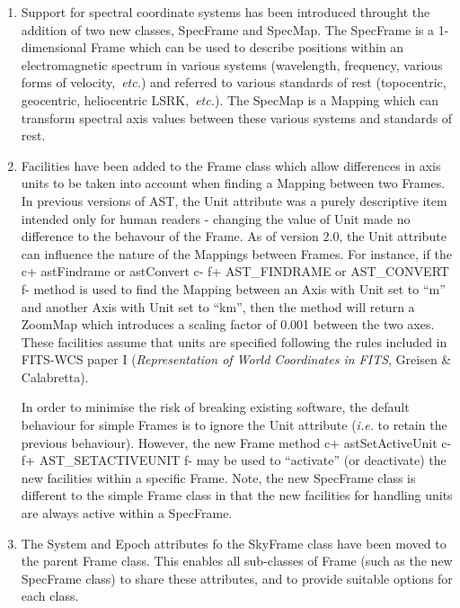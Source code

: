 \documentclass[twoside,11pt]{article}
\begin{document}
\begin{enumerate}

\item Support for spectral coordinate systems has been introduced
throught the addition of two new classes, SpecFrame and SpecMap.
The SpecFrame is a 1-dimensional Frame which can be used to describe
positions within an electromagnetic spectrum in various systems
(wavelength, frequency, various forms of velocity,~{\em{etc.}}) and referred
to various standards of rest (topocentric, geocentric, heliocentric
LSRK,~{\em{etc.}}). The SpecMap is a Mapping which can transform spectral
axis values between these various systems and standards of rest.

\item Facilities have been added to the Frame class which allow
differences in axis units to be taken into account when finding a Mapping
between two Frames. In previous versions of AST, the Unit attribute was a
purely descriptive item intended only for human readers - changing the
value of Unit made no difference to the behavour of the Frame. As of
version 2.0, the Unit attribute can influence the nature of the Mappings
between Frames. For instance, if the 
c+
astFindrame or astConvert
c-
f+
AST\_FINDRAME or AST\_CONVERT
f-
method is used to find the Mapping between an Axis with Unit set to ``m''
and another Axis with Unit set to ``km'', then the method will return a 
ZoomMap which introduces a scaling factor of 0.001 between the two axes.
These facilities assume that units are specified following the rules
included in FITS-WCS paper I ({\em Representation of World
Coordinates in FITS}, Greisen \& Calabretta).

In order to minimise the risk of breaking existing software, the default 
behaviour for simple Frames is to ignore the Unit attribute ({\em{i.e.}}
to retain the previous behaviour). However, the new Frame method 
c+
astSetActiveUnit
c-
f+
AST\_SETACTIVEUNIT
f-
may be used to ``activate'' (or deactivate) the new facilities within a 
specific Frame. Note, the new SpecFrame class is different to the simple
Frame class in that the new facilities for handling units are always active
within a SpecFrame. 
 
\item The System and Epoch attributes fo the SkyFrame class have been
moved to the parent Frame class. This enables all sub-classes of Frame
(such as the new SpecFrame class) to share these attributes, and to provide
suitable options for each class.


\end{enumerate}
\end{document}
